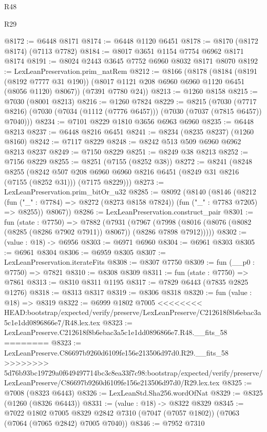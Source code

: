 \begin{lexlean}{R48}
\begin{lexlean}{R29}
\begin{coremodule}
{{{{{{{{{{{{{{{{{{{{{{{{{{{{{{{{{{{{{{{{{{{{{{{{{{{{{{{{{{{{{{{{{{{{{{{{{{{{{{{{{{{{{{{{{{{{{{{{{{{{{{{{{{{{{{{{{{{{{{{{{{{{{{{{{{{{{{{{{{{{{{{{{{{{{{{{{{{{{{{{{{{{{{{{{{{{{{{{{{{{{{{{{{{{{{{{{{{{{{{{{{{{{{{{{{{{{{{{{{@8172 := @6448 @8171
@8174 := @6448 @1120 @6451
@8178 := @8170 (@8172 @8174) (@7113 @7782)
@8184 := @8017 @3651 @1154 @7754 @6962 @8171 @8174
@8191 := @8024 @2443 @3645 @7752 @6960 @8032 @8171 @8070
@8192 := LexLeanPreservation.prim_natRem
@8212 := @8166
    (@8178
      (@8184
        (@8191 (@8192 @7777 @31 @190))
        (@8017 @1121 @208 @6960 @6960 @1120 @6451 (@8056 @1120) @8067))
      (@7391 @7780 @24))
@8213 := @1260 @8158
@8215 := @7030 (@8001 @8213)
@8216 := @1260 @7824
@8229 := @8215
    (@7030 (@7717 @8216) (@7030 (@7034 (@1112 (@7776 @6457))) (@7030 (@7037 (@7815 @6457)) @7040)))
@8234 := @7101 @8229 @1810 @3656 @6963 @6960
@8235 := @6448 @8213
@8237 := @6448 @8216 @6451
@8241 := @8234 (@8235 @8237) (@1260 @8160)
@8242 := @7117 @8229
@8248 := @8242 @513 @509 @6960 @6962 @8213 @8237
@8249 := @7150 @8229
@8251 := @8249 @38 @8213
@8252 := @7156 @8229
@8255 := @8251 (@7155 (@8252 @38))
@8272 := @8241
    (@8248
      @8255
      (@8242 @507 @208 @6960 @6960 @8216 @6451 (@8249 @31 @8216 (@7155 (@8252 @31))) (@7175 @8229)))
@8273 := LexLeanPreservation.prim_bitOr_u32
@8285 := @8092
    (@8140
      (@8146
        (@8212 (fun ("_" : @7784) => @8272 (@8273 @8158 @7824)) (fun ("_" : @7783 @7205) => @8255))
        @8067))
@8286 := LexLeanPreservation.construct_pair
@8301 := fun (state : @7750) =>
  @7882
    (@7931
      (@7967 (@7998 (@8016 (@8076 (@8082 (@8285 (@8286 @7902 @7911)) @8067)) (@8286 @7898 @7912)))))
@8302 := (value : @18) -> @6956
@8303 := @6971 @6960
@8304 := @6961 @8303
@8305 := @6961 @8304
@8306 := @6959 @8305
@8307 := LexLeanPreservation.iterateFits
@8308 := @8307 @7750
@8309 := fun (__p0 : @7750) => @7821
@8310 := @8308 @8309
@8311 := fun (state : @7750) => @7861
@8313 := @8310 @8311 @1195
@8317 := @7829 @6443 (@7835 @2825 @1276)
@8318 := @8313 @8317
@8319 := @8306 @8318
@8320 := fun (value : @18) => @8319
@8322 := @6999 @1802 @7005
<<<<<<<< HEAD:bootstrap/expected/verify/preserve/LexLeanPreserve/C212618f8b6ebac3a5c1e1dd0896866e7/R48.lex.tex
@8323 := LexLeanPreserve.C212618f8b6ebac3a5c1e1dd0896866e7.R48.__fits_58
========
@8323 := LexLeanPreserve.C86697b9260d6109fe156e213506d97d0.R29.__fits_58
>>>>>>>> 5d76b93bc19729a0f649497714bc3c8ea33f7c98:bootstrap/expected/verify/preserve/LexLeanPreserve/C86697b9260d6109fe156e213506d97d0/R29.lex.tex
@8325 := @7008 (@8323 @6443)
@8326 := LexLeanStd.Sha256.wordOfNat
@8329 := @8325 (@1260 (@8326 @6443))
@8331 := (value : @18) -> @8322 @8329
@8345 := @7022
    @1802
    @7005
    @8329
    @2842
    @7310
    (@7047 (@7057 @1802))
    (@7063 (@7064 (@7065 @2842) @7005 @7040))
@8346 := @7952 @7310
}}}}}}}}}}}}}}}}}}}}}}}}}}}}}}}}}}}}}}}}}}}}}}}}}}}}}}}}}}}}}}}}}}}}}}}}}}}}}}}}}}}}}}}}}}}}}}}}}}}}}}}}}}}}}}}}}}}}}}}}}}}}}}}}}}}}}}}}}}}}}}}}}}}}}}}}}}}}}}}}}}}}}}}}}}}}}}}}}}}}}}}}}}}}}}}}}}}}}}}}}}}}}}}}}}}}}}}}}}
\end{coremodule}
\end{lexlean}
\end{lexlean}

